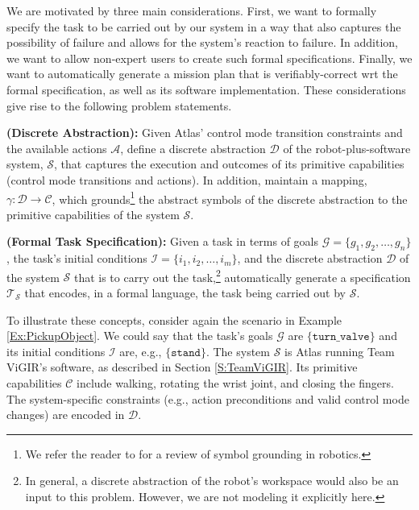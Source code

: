 
We are motivated by three main considerations.
First, we want to formally specify the task to be carried out by our system in a way that also captures the possibility of failure and allows for the system's reaction to failure.
In addition, we want to allow non-expert users to create such formal specifications.
Finally, we want to automatically generate a mission plan that is verifiably-correct \ac{wrt} the formal specification, as well as its software implementation.
These considerations give rise to the following problem statements.

\begin{myProblem}\label{DiscreteAbstractionProblem}
\textbf{(Discrete Abstraction):}
Given Atlas' control mode transition constraints and the available actions $\mathcal{A}$, define a discrete abstraction $\mathcal{D}$ of the robot-plus-software system, $\mathcal{S}$, that captures the execution and outcomes of its primitive capabilities (control mode transitions and actions).
In addition, maintain a mapping, $\gamma: \mathcal{D} \rightarrow \mathcal{C}$, which grounds\footnote{We refer the reader to \cite{Grounding2013} for a review of symbol grounding in robotics.}
 the abstract symbols of the discrete abstraction to the primitive capabilities of the system $\mathcal{S}$.
\end{myProblem}

\begin{myProblem}\label{SpecificationProblem}
\textbf{(Formal Task Specification):}
Given a task in terms of goals $\mathcal{G} = \{ g_1, g_2, \ldots, g_n \}$, the task's initial conditions $\mathcal{I} = \{ i_1, i_2, \ldots, i_m \}$, and the discrete abstraction $\mathcal{D}$ of the system $\mathcal{S}$ that is to carry out the task,\footnote{In general, a discrete abstraction of the robot's workspace would also be an input to this problem. However, we are not modeling it explicitly here.}
 automatically generate a specification $\mathcal{T}_\mathcal{S}$ that encodes, in a formal language, the task being carried out by $\mathcal{S}$.
\end{myProblem}

To illustrate these concepts, consider again the scenario in Example \ref{Ex:PickupObject}. 
We could say that the task's goals $\mathcal{G}$ are $\{ \mathtt{turn\_valve} \}$ and its initial conditions $\mathcal{I}$ are, e.g., $\{ \mathtt{stand} \}$.
The system $\mathcal{S}$ is Atlas running Team ViGIR's software, as described in Section \ref{S:TeamViGIR}.
Its primitive capabilities $\mathcal{C}$ include walking, rotating the wrist joint, and closing the fingers.
The system-specific constraints (e.g., action preconditions and  valid control mode changes) are encoded in $\mathcal{D}$.

